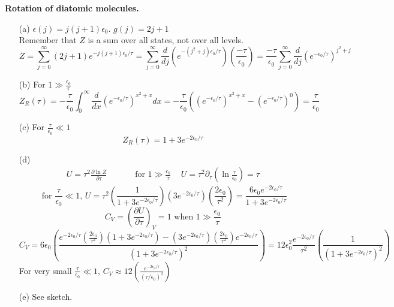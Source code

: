 \documentclass[twoside]{amsart}
\theoremstyle{plain}
\theoremstyle{definition}
\newcommand{\solutionhead}[1]
  {
   \noindent{\small\bf Solution #1.}
   }
\begin{document}
\solutionhead{6} \textbf{Rotation of diatomic molecules.} 
\begin{itemize}
\item[(a)] $\epsilon(j) = j(j+1) \epsilon_0$.  $g(j) = 2j+1$  \\
Remember that $Z$ is a sum over all states, not over all levels.  
\[
Z = \sum_{j=0}^{\infty} (2j+1) e^{-j(j+1) \epsilon_0 /\tau} = \sum_{j=0}^{\infty} \frac{d}{dj} (e^{- (j^2  + j) \epsilon_0/\tau } ) \left( \frac{-\tau}{\epsilon_0} \right) = \frac{-\tau}{\epsilon_0} \sum_{j=0}^{\infty} \frac{d}{dj}  \left( e^{-\epsilon_0/\tau} \right)^{j^2 + j} 
\]
\item[(b)] For $1 \gg \frac{\epsilon_0}{\tau}$
\[
Z_R(\tau)  =-\frac{\tau}{\epsilon_0} \int_0^{\infty} \frac{d}{dx}  \left( e^{-\epsilon_0/\tau} \right)^{x^2 +  x}  dx = -\frac{\tau}{\epsilon_0} \left( (e^{-\epsilon_0/\tau})^{x^2 + x} - (e^{-\epsilon_0/\tau} )^0 \right) = \frac{\tau}{\epsilon_0}
\]
\item[(c)] For $\frac{\tau}{\epsilon_0} \ll 1$
\[
Z_R(\tau) = 1 + 3 e^{-2\epsilon_0 /\tau}
\]
\item[(d)] 
\[
\begin{gathered}
  U = \tau^2 \frac{\partial \ln{Z}}{ \partial \tau} \quad \quad \quad \text{ for } 1 \gg \frac{\epsilon_0 }{\tau} \quad \, U  =\tau^2  \partial_{\tau} \left( \ln{ \frac{\tau}{\epsilon_0} } \right) = \tau
\end{gathered}
\]
\[
\text{ for } \frac{\tau }{\epsilon_0 } \ll 1, \, U = \tau^2 \left( \frac{1}{ 1 + 3 e^{-2\epsilon_0/\tau}  } \right) (3e^{-2\epsilon_0/\tau }) \left( \frac{2\epsilon_0 }{\tau^2} \right) = \frac{ 6 \epsilon_0 e^{-2\epsilon_0/\tau} }{ 1 + 3 e^{-2\epsilon_0/\tau } }
\]
\[
\boxed{ C_V = \left( \frac{ \partial U}{ \partial \tau} \right)_V = 1 \text{ when } 1 \gg \frac{\epsilon_0}{\tau} }
\]
\[
C_V = 6 \epsilon_0 \left( \frac{ e^{-2\epsilon_0/\tau} \left( \frac{2\epsilon_0 }{\tau^2 }\right) (1 + 3 e^{-2\epsilon_0/\tau} ) - (3e^{-2\epsilon_0/ \tau} )\left( \frac{2\epsilon_0 }{\tau^2 } \right)e^{-2\epsilon_0/\tau} }{ (1 + 3e^{-2\epsilon_0/\tau} )^2 } \right) = 12 \epsilon_0^2 \frac{e^{-2\epsilon_0/\tau }}{\tau^2 }\left( \frac{1}{  ( 1 + 3 e^{-2\epsilon_0/\tau} )^2 } \right)
\]
For very small $\frac{\tau }{\epsilon_0} \ll 1$, $\boxed{ C_V \approx 12 \left( \frac{ e^{-2\epsilon_0 /\tau } }{ (\tau/\epsilon_0 )^2 } \right)}$  
\item[(e)] See sketch.
\end{itemize}
\end{document}
